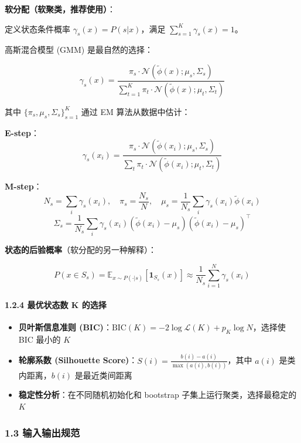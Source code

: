 \documentclass[
  12pt,
]{ctexart}
\providecommand{\tightlist}{%
  \setlength{\itemsep}{0pt}\setlength{\parskip}{0pt}}
\begin{document}
\textbf{软分配（软聚类，推荐使用）}：

定义状态条件概率 \(\gamma_s(x) = P(s|x)\)，满足
\(\sum_{s=1}^K \gamma_s(x) = 1\)。

高斯混合模型 (GMM) 是最自然的选择：

\[
\gamma_s(x) = \frac{\pi_s \cdot \mathcal{N}(\tilde{\phi}(x); \mu_s, \Sigma_s)}{\sum_{t=1}^K \pi_t \cdot \mathcal{N}(\tilde{\phi}(x); \mu_t, \Sigma_t)}
\]

其中 \(\{ \pi_s, \mu_s, \Sigma_s \}_{s=1}^K\) 通过 EM 算法从数据中估计：

\textbf{E-step}： \[
\gamma_s(x_i) = \frac{\pi_s \cdot \mathcal{N}(\tilde{\phi}(x_i); \mu_s, \Sigma_s)}{\sum_t \pi_t \cdot \mathcal{N}(\tilde{\phi}(x_i); \mu_t, \Sigma_t)}
\]

\textbf{M-step}： \[
N_s = \sum_i \gamma_s(x_i), \quad \pi_s = \frac{N_s}{N}, \quad \mu_s = \frac{1}{N_s} \sum_i \gamma_s(x_i) \tilde{\phi}(x_i)
\] \[
\Sigma_s = \frac{1}{N_s} \sum_i \gamma_s(x_i) (\tilde{\phi}(x_i) - \mu_s)(\tilde{\phi}(x_i) - \mu_s)^\top
\]

\textbf{状态的后验概率}（软分配的另一种解释）：

\[
P(x \in S_s) = \mathbb{E}_{x \sim P(\cdot|s)}[\mathbf{1}_{S_s}(x)] \approx \frac{1}{N_s} \sum_{i=1}^{N} \gamma_s(x_i)
\]

\paragraph{1.2.4 最优状态数 K
的选择}\label{ux6700ux4f18ux72b6ux6001ux6570-k-ux7684ux9009ux62e9}

\begin{itemize}
\tightlist
\item
  \textbf{贝叶斯信息准则
  (BIC)}：\(\text{BIC}(K) = -2 \log \mathcal{L}(K) + p_K \log N\)，选择使
  BIC 最小的 \(K\)
\item
  \textbf{轮廓系数 (Silhouette
  Score)}：\(S(i) = \frac{b(i) - a(i)}{\max(a(i), b(i))}\)，其中
  \(a(i)\) 是类内距离，\(b(i)\) 是最近类间距离
\item
  \textbf{稳定性分析}：在不同随机初始化和 bootstrap
  子集上运行聚类，选择最稳定的 \(K\)
\end{itemize}

\subsubsection{1.3
输入输出规范}\label{ux8f93ux5165ux8f93ux51faux89c4ux8303}
\end{document}
